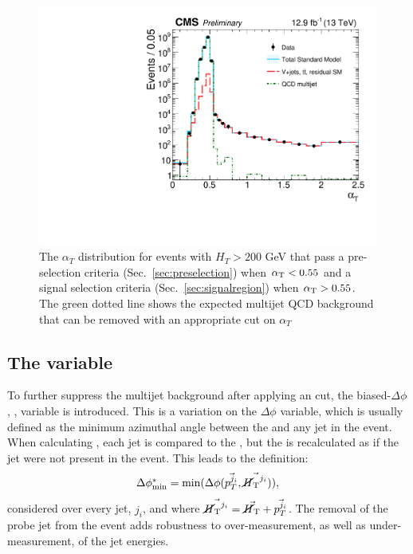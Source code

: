 \begin{figure}
	\begin{center}
		\includegraphics[width=0.7\linewidth]{figs/analysis/eventSelection/CMS-PAS-SUS-16-016_Figure-aux_001}%
	\end{center}
  \caption{The $\alpha_T$ distribution for events with $H_T>200$ GeV
  that pass a pre-selection criteria (Sec.~\ref{sec:preselection}) when
  $\alpha_{\text{T}}<0.55$ and a signal selection criteria
  (Sec.~\ref{sec:signalregion}) when
  $\alpha_{\text{T}}>0.55$. The green dotted line shows the expected multijet
  QCD background that can be removed with an appropriate cut on
  $\alpha_T$}
	\label{fig:alphaT}
\end{figure}

\subsection{The \bdphi variable}

To further suppress the \QCD multijet background after applying an
\alphat cut, the biased-$\Delta\phi$, \bdphi, variable is introduced.
This is a variation on the $\Delta\phi$ variable, which is usually
defined as the minimum azimuthal angle between the \MET and any jet in
the event. When calculating \bdphi, each jet is compared to the
\MHT, but the \MHT is recalculated as if the jet were not present in
the event. This leads to the definition:
\begin{equation}
\mbox{$\Delta\phi^{*}_{\rm min}$} = \mathrm{min}(\Delta\phi(\vec{p_T^{j_i}},\vec{\mbox{$\cancel{H}_\text{T}$}^{j_i}})),
\end{equation}
considered over every jet, $j_i$, and where
$\vec{\mbox{$\cancel{H}_\text{T}$}^{j_i}}=\vec{\mbox{$\cancel{H}_\text{T}$}}+\vec{p_T^{j_i}}$. The removal of the
probe jet from the event adds robustness to over-measurement, as well
as under-measurement, of the jet energies.

